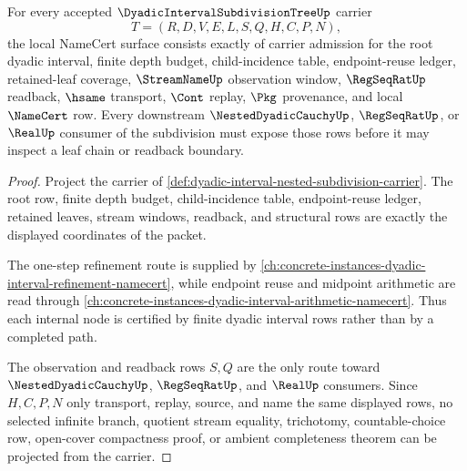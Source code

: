 \begin{theorem}
\label{thm:dyadic-interval-nested-subdivision-obligations}
For every accepted $\DyadicIntervalSubdivisionTreeUp$ carrier
$$
T=(R,D,V,E,L,S,Q,H,C,P,N),
$$
the local NameCert surface consists exactly of carrier admission for the root dyadic interval, finite depth budget, child-incidence table, endpoint-reuse ledger, retained-leaf coverage, $\StreamNameUp$ observation window, $\RegSeqRatUp$ readback, $\hsame$ transport, $\Cont$ replay, $\Pkg$ provenance, and local $\NameCert$ row. Every downstream $\NestedDyadicCauchyUp$, $\RegSeqRatUp$, or $\RealUp$ consumer of the subdivision must expose those rows before it may inspect a leaf chain or readback boundary.
\end{theorem}
\begin{proof}
Project the carrier of \autoref{def:dyadic-interval-nested-subdivision-carrier}. The root row, finite depth budget, child-incidence table, endpoint-reuse ledger, retained leaves, stream windows, readback, and structural rows are exactly the displayed coordinates of the packet.

The one-step refinement route is supplied by \autoref{ch:concrete-instances-dyadic-interval-refinement-namecert}, while endpoint reuse and midpoint arithmetic are read through \autoref{ch:concrete-instances-dyadic-interval-arithmetic-namecert}. Thus each internal node is certified by finite dyadic interval rows rather than by a completed path.

The observation and readback rows $S,Q$ are the only route toward $\NestedDyadicCauchyUp$, $\RegSeqRatUp$, and $\RealUp$ consumers. Since $H,C,P,N$ only transport, replay, source, and name the same displayed rows, no selected infinite branch, quotient stream equality, trichotomy, countable-choice row, open-cover compactness proof, or ambient completeness theorem can be projected from the carrier.
\end{proof}


